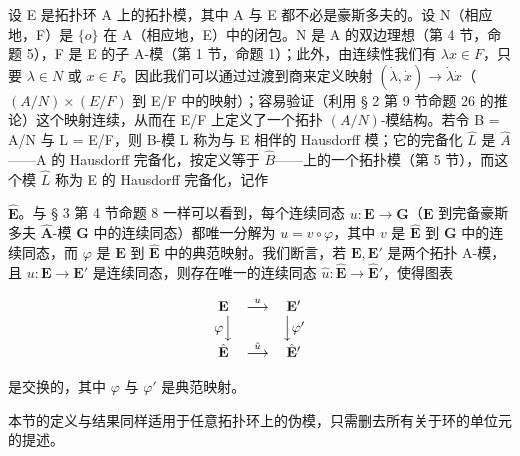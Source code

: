 设 E 是拓扑环 A 上的拓扑模，其中 A 与 E 都不必是豪斯多夫的。设 N（相应地，F）是 \(\{o\}\) 在 A（相应地，E）中的闭包。N 是 A 的双边理想（第 4 节，命题 5），F 是 E 的子 A-模（第 1 节，命题 1）；此外，由连续性我们有 \(\lambda x \in F\)，只要 \(\lambda \in N\) 或 \(x \in F\)。因此我们可以通过过渡到商来定义映射 \((\dot{\lambda}, \dot{x}) \to \dot{\lambda} \dot{x}\)（\((A/N) \times (E/F)\) 到 E/F 中的映射）；容易验证（利用 § 2 第 9 节命题 26 的推论）这个映射连续，从而在 E/F 上定义了一个拓扑 \((A/N)\)-模结构。若令 B = A/N 与 L = E/F，则 B-模 L 称为与 E 相伴的 Hausdorff 模；它的完备化 \(\hat{L}\) 是 \(\hat{A}\)——A 的 Hausdorff 完备化，按定义等于 \(\hat{B}\)——上的一个拓扑模（第 5 节），而这个模 \(\hat{L}\) 称为 E 的 Hausdorff 完备化，记作

\(\hat{\mathbf{E}}\)。与 § 3 第 4 节命题 8 一样可以看到，每个连续同态 \(u: \mathbf{E} \to \mathbf{G}\)（\(\mathbf{E}\) 到完备豪斯多夫 \(\hat{\mathbf{A}}\)-模 \(\mathbf{G}\) 中的连续同态）都唯一分解为 \(u = v \circ \varphi\)，其中 \(v\) 是 \(\hat{\mathbf{E}}\) 到 \(\mathbf{G}\) 中的连续同态，而 \(\varphi\) 是 \(\mathbf{E}\) 到 \(\hat{\mathbf{E}}\) 中的典范映射。我们断言，若 \(\mathbf{E}, \mathbf{E}'\) 是两个拓扑 A-模，且 \(u: \mathbf{E} \to \mathbf{E}'\) 是连续同态，则存在唯一的连续同态 \(\hat{u}: \hat{\mathbf{E}} \to \hat{\mathbf{E}}'\)，使得图表

\[
\begin{array}{c c c} \mathbf {E} & \stackrel {{u}} {{\longrightarrow}} & \mathbf {E} ^ {\prime} \\ \varphi \Big \downarrow & & \Big \downarrow \varphi^ {\prime} \\ \hat {\mathbf {E}} & \stackrel {{\hat {u}}} {{\longrightarrow}} & \hat {\mathbf {E}} ^ {\prime} \end{array}
\]

是交换的，其中 \(\varphi\) 与 \(\varphi'\) 是典范映射。

本节的定义与结果同样适用于任意拓扑环上的伪模，只需删去所有关于环的单位元的提述。

